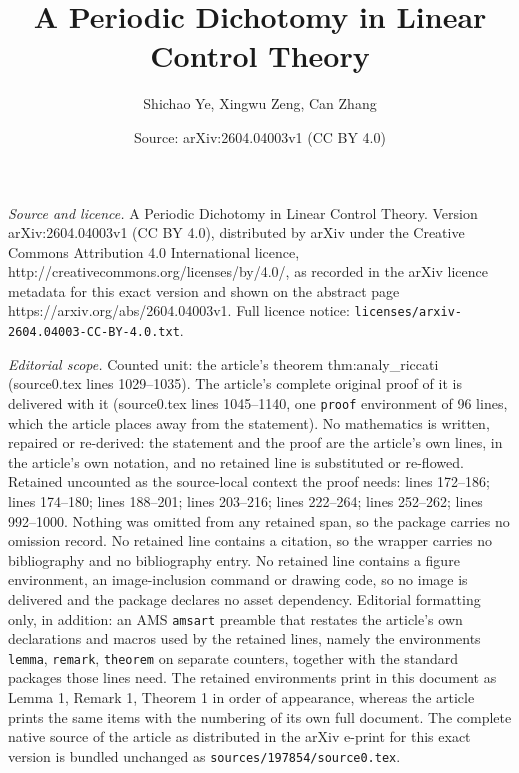 \documentclass[10pt,a4paper]{amsart}
\title{A Periodic Dichotomy in Linear Control Theory}
\author{Shichao Ye, Xingwu Zeng, Can Zhang}
\date{Source: arXiv:2604.04003v1 (CC BY 4.0)}
\begin{document}
\maketitle

\noindent\emph{Source and licence.} A Periodic Dichotomy in Linear Control Theory. Version arXiv:2604.04003v1 (CC BY 4.0), distributed by arXiv under the Creative Commons Attribution 4.0 International licence, http://creativecommons.org/licenses/by/4.0/, as recorded in the arXiv licence metadata for this exact version and shown on the abstract page https://arxiv.org/abs/2604.04003v1. Full licence notice: \texttt{licenses/arxiv-2604.04003-CC-BY-4.0.txt}.\par\smallskip

\noindent\textit{Editorial scope.} Counted unit: the article's theorem thm:analy\_riccati (source0.tex lines 1029--1035). The article's complete original proof of it is delivered with it (source0.tex lines 1045--1140, one \texttt{proof} environment of 96 lines, which the article places away from the statement). No mathematics is written, repaired or re-derived: the statement and the proof are the article's own lines, in the article's own notation, and no retained line is substituted or re-flowed.  Retained uncounted as the source-local context the proof needs: lines 172--186; lines 174--180; lines 188--201; lines 203--216; lines 222--264; lines 252--262; lines 992--1000.  Nothing was omitted from any retained span, so the package carries no omission record.  No retained line contains a citation, so the wrapper carries no bibliography and no bibliography entry.  No retained line contains a figure environment, an image-inclusion command or drawing code, so no image is delivered and the package declares no asset dependency.  Editorial formatting only, in addition: an AMS \texttt{amsart} preamble that restates the article's own declarations and macros used by the retained lines, namely the environments \texttt{lemma}, \texttt{remark}, \texttt{theorem} on separate counters, together with the standard packages those lines need.  The retained environments print in this document as Lemma 1, Remark 1, Theorem 1 in order of appearance, whereas the article prints the same items with the numbering of its own full document.  The complete native source of the article as distributed in the arXiv e-print for this exact version is bundled unchanged as \texttt{sources/197854/source0.tex}.
\end{document}
